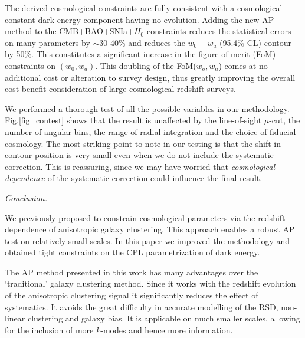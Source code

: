 \documentclass[prl,twocolumn,superscriptaddress,aps,amsmath,amssymb,nofootinbib,altaffilletter]{revtex4}
\begin{document}
The derived cosmological constraints are fully consistent with a cosmological constant dark energy component having no evolution.
Adding the new AP method to the CMB+BAO+SNIa+$H_0$ constraints reduces the statistical errors on many parameters by $\sim$30-40\% 
and reduces the $w_0-w_a$ (95.4\% CL) contour by 50\%.
This constitutes a significant increase in the figure of merit (FoM)  constraints on $(w_0, w_a)$. This doubling of the FoM($w_o,w_a$) comes at no additional cost or alteration to survey design, thus greatly improving the overall cost-benefit consideration of large cosmological redshift surveys.

We performed a thorough test of all the possible variables in our methodology.
Fig.\ref{fig_contest} shows that 
the result is unaffected by the line-of-sight $\mu$-cut, 
the number of angular bins, 
the range of radial integration and the choice of fiducial cosmology. 
The most striking point to note in our testing is that the 
shift in contour position is very small even when we do not include the systematic correction.
This is reassuring, since we may have worried that {\it cosmological dependence} 
of the systematic correction could influence the final result. 

{\it Conclusion.}---

We previously proposed to constrain cosmological parameters via 
the redshift dependence of anisotropic galaxy clustering\cite{Li2016}.
This approach enables a robust AP test on relatively small scales.
In this paper we improved the methodology and obtained tight constraints on the CPL parametrization of dark energy.

The AP method presented in this work has many advantages over the `traditional' galaxy clustering method.
Since it works with the redshift evolution of the anisotropic clustering signal it significantly reduces the effect of systematics. 
It avoids the great difficulty in accurate modelling of the RSD, non-linear clustering and galaxy bias.
It is applicable on much smaller scales, allowing for the inclusion of more $k$-modes and hence more information. 
\end{document}
